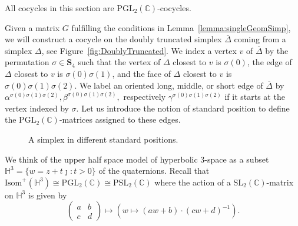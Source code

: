 \documentclass[utopia,fullpage]{nmd/article}
\newcommand\C{\mathbb C}
\renewcommand\H{\mathbb H}
\newcommand\myPGL[2]{\mathrm{PGL}_{#1}(#2)}
\newcommand\myPSL[2]{\mathrm{PSL}_{#1}(#2)}
\newcommand\mySL[2]{\mathrm{SL}_{#1}(#2)}
\newcommand\permS{\mathbf{S}}
\newcommand\myJ{\jmath}
\begin{document}
All cocycles in this section are $\myPGL{2}{\C}$-cocycles.

Given a matrix $G$ fulfilling the conditions in Lemma~\ref{lemma:singleGeomSimp}, we will construct a cocycle on the doubly truncated simplex $\overline{\Delta}$ coming from a simplex $\Delta$, see Figure~\ref{fig:DoublyTruncated}. We index a vertex $v$ of $\overline{\Delta}$ by the permutation $\sigma\in \permS_4$ such that the vertex of $\Delta$ closest to $v$ is $\sigma(0)$, the edge of $\Delta$ closest to $v$ is $\sigma(0)\sigma(1)$, and the face of $\Delta$ closest to $v$ is $\sigma(0)\sigma(1)\sigma(2)$. We label an oriented long, middle, or short edge of $\overline{\Delta}$ by $\alpha^{\sigma(0)\sigma(1)\sigma(2)}, \beta^{\sigma(0)\sigma(1)\sigma(2)},$ respectively $\gamma^{\sigma(0)\sigma(1)\sigma(2)}$ if it starts at the vertex indexed by $\sigma$. Let us introduce the notion of standard position to define the $\myPGL{2}{\C}$-matrices assigned to these edges.

\begin{figure}
\begin{center}
\scalebox{0.9}{
}
\end{center}
\caption{A simplex in different standard positions.} \label{fig:standardPos}
\end{figure}

We think of the upper half space model of hyperbolic 3-space  as a subset $\H^3=\{w = z+t\myJ : t>0\}$ of the quaternions. Recall that $\mathrm{Isom}^+(\H^3)\cong\myPGL{2}{\C} \cong\myPSL{2}{\C}$ where the action of a $\mySL{2}{\C}$-matrix on $\H^3$ is given by
$$\left(\begin{array}{cc}a &b\\ c&d\end{array}\right)\mapsto \left( w \mapsto (aw+b)\cdot(cw+d)^{-1} \right).$$
\end{document}
